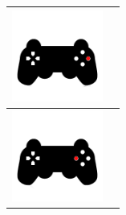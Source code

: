 \begin{table}[H]
\begin{center}
\begin{tabular}{|p{3cm}|p{8cm}|}
      \hline
       \includegraphics[width=3cm]{./imagenes/pad-6.png} & \vspace*{-.8in}{Sin función.} \\
      \hline
      \includegraphics[width=3cm]{./imagenes/pad-8.png} & \vspace*{-.8in}{Disminuir velocidad. La velocidad de movimiento del vehículo disminuye.} \\
      \hline
    \end{tabular}
  \end{center}
\end{table}


